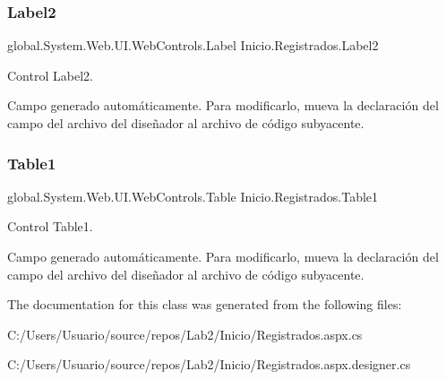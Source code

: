 \subsubsection{\texorpdfstring{Label2}{Label2}}
{\footnotesize\ttfamily global.\+System.\+Web.\+U\+I.\+Web\+Controls.\+Label Inicio.\+Registrados.\+Label2\hspace{0.3cm}{\ttfamily [protected]}}



Control Label2. 

Campo generado automáticamente. Para modificarlo, mueva la declaración del campo del archivo del diseñador al archivo de código subyacente. \mbox{\label{class_inicio_1_1_registrados_a0c8cbd7625175b47e930f927da038acc}} 
\subsubsection{\texorpdfstring{Table1}{Table1}}
{\footnotesize\ttfamily global.\+System.\+Web.\+U\+I.\+Web\+Controls.\+Table Inicio.\+Registrados.\+Table1\hspace{0.3cm}{\ttfamily [protected]}}



Control Table1. 

Campo generado automáticamente. Para modificarlo, mueva la declaración del campo del archivo del diseñador al archivo de código subyacente. 

The documentation for this class was generated from the following files\+:\begin{DoxyCompactItemize}
\item 
C\+:/\+Users/\+Usuario/source/repos/\+Lab2/\+Inicio/Registrados.\+aspx.\+cs\item 
C\+:/\+Users/\+Usuario/source/repos/\+Lab2/\+Inicio/Registrados.\+aspx.\+designer.\+cs\end{DoxyCompactItemize}
